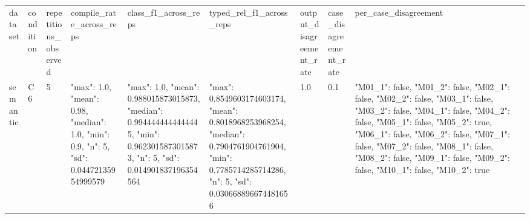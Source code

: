 \begin{tabular}{lllllllll}
dataset & condition & repetitions\_observed & compile\_rate\_across\_reps & class\_f1\_across\_reps & typed\_rel\_f1\_across\_reps & output\_disagreement\_rate & case\_disagreement\_rate & per\_case\_disagreement \\
semantic & C6 & 5 & {"max": 1.0, "mean": 0.98, "median": 1.0, "min": 0.9, "n": 5, "sd": 0.04472135954999579} & {"max": 1.0, "mean": 0.988015873015873, "median": 0.9944444444444445, "min": 0.9623015873015873, "n": 5, "sd": 0.014901837196354564} & {"max": 0.8549603174603174, "mean": 0.8018968253968254, "median": 0.7904761904761904, "min": 0.7785714285714286, "n": 5, "sd": 0.030668896674481656} & 1.0 & 0.1 & {"M01\_1": false, "M01\_2": false, "M02\_1": false, "M02\_2": false, "M03\_1": false, "M03\_2": false, "M04\_1": false, "M04\_2": false, "M05\_1": false, "M05\_2": true, "M06\_1": false, "M06\_2": false, "M07\_1": false, "M07\_2": false, "M08\_1": false, "M08\_2": false, "M09\_1": false, "M09\_2": false, "M10\_1": false, "M10\_2": true} \\
\end{tabular}